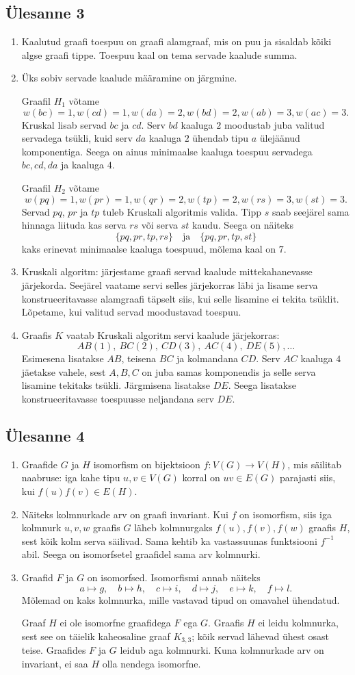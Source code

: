 \documentclass[11pt,a4paper]{article}
\newcommand{\yl}[1]{\subsection*{Ülesanne #1}}
\begin{document}
\yl{3}
\begin{enumerate}[label=\alph*.]
\item Kaalutud graafi toespuu on graafi alamgraaf, mis on puu ja sisaldab kõiki algse graafi tippe. Toespuu kaal on tema servade kaalude summa.
\item Üks sobiv servade kaalude määramine on järgmine.

Graafil $H_1$ võtame
\[
 w(bc)=1,
 w(cd)=1,
 w(da)=2,
 w(bd)=2,
 w(ab)=3,
 w(ac)=3.
\]
Kruskal lisab servad $bc$ ja $cd$. Serv $bd$ kaaluga $2$ moodustab juba valitud servadega tsükli, kuid serv $da$ kaaluga $2$ ühendab tipu $a$ ülejäänud komponentiga. Seega on ainus minimaalse kaaluga toespuu servadega $bc,cd,da$ ja kaaluga $4$.

Graafil $H_2$ võtame
\[
 w(pq)=1,
 w(pr)=1,
 w(qr)=2,
 w(tp)=2,
 w(rs)=3,
 w(st)=3.
\]
Servad $pq$, $pr$ ja $tp$ tuleb Kruskali algoritmis valida. Tipp $s$ saab seejärel sama hinnaga liituda kas serva $rs$ või serva $st$ kaudu. Seega on näiteks
\[
\{pq,pr,tp,rs\}\quad\text{ja}\quad \{pq,pr,tp,st\}
\]
kaks erinevat minimaalse kaaluga toespuud, mõlema kaal on $7$.
\item Kruskali algoritm: järjestame graafi servad kaalude mittekahanevasse järjekorda. Seejärel vaatame servi selles järjekorras läbi ja lisame serva konstrueeritavasse alamgraafi täpselt siis, kui selle lisamine ei tekita tsüklit. Lõpetame, kui valitud servad moodustavad toespuu.
\item Graafis $K$ vaatab Kruskali algoritm servi kaalude järjekorras:
\[
AB(1),\ BC(2),\ CD(3),\ AC(4),\ DE(5),\ldots
\]
Esimesena lisatakse $AB$, teisena $BC$ ja kolmandana $CD$. Serv $AC$ kaaluga $4$ jäetakse vahele, sest $A,B,C$ on juba samas komponendis ja selle serva lisamine tekitaks tsükli. Järgmisena lisatakse $DE$. Seega lisatakse konstrueeritavasse toespuusse neljandana serv $DE$.
\end{enumerate}

\yl{4}
\begin{enumerate}[label=\alph*.]
\item Graafide $G$ ja $H$ isomorfism on bijektsioon $f:V(G)\to V(H)$, mis säilitab naabruse: iga kahe tipu $u,v\in V(G)$ korral on $uv\in E(G)$ parajasti siis, kui $f(u)f(v)\in E(H)$.
\item Näiteks kolmnurkade arv on graafi invariant. Kui $f$ on isomorfism, siis iga kolmnurk $u,v,w$ graafis $G$ läheb kolmnurgaks $f(u),f(v),f(w)$ graafis $H$, sest kõik kolm serva säilivad. Sama kehtib ka vastassuunas funktsiooni $f^{-1}$ abil. Seega on isomorfsetel graafidel sama arv kolmnurki.
\item Graafid $F$ ja $G$ on isomorfsed. Isomorfismi annab näiteks
\[
a\mapsto g,
\quad b\mapsto h,
\quad c\mapsto i,
\quad d\mapsto j,
\quad e\mapsto k,
\quad f\mapsto l.
\]
Mõlemad on kaks kolmnurka, mille vastavad tipud on omavahel ühendatud.

Graaf $H$ ei ole isomorfne graafidega $F$ ega $G$. Graafis $H$ ei leidu kolmnurka, sest see on täielik kaheosaline graaf $K_{3,3}$; kõik servad lähevad ühest osast teise. Graafides $F$ ja $G$ leidub aga kolmnurki. Kuna kolmnurkade arv on invariant, ei saa $H$ olla nendega isomorfne.
\end{enumerate}
\end{document}
